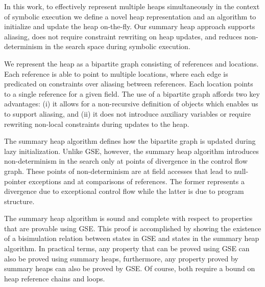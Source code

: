 
In this work, to effectively represent multiple heaps simultaneously
in the context of symbolic execution we define a novel heap
representation and an algorithm to initialize and update the heap
on-the-fly. Our summary heap approach supports aliasing, does not
require constraint rewriting on heap updates, and reduces
non-determinism in the search space during symbolic execution.

We represent the heap as a bipartite graph consisting of references
and locations. Each reference is able to point to multiple locations,
where each edge is predicated on constraints over aliasing between
references. Each location points to a single reference for a given
field. The use of a bipartite graph affords two key advantages: (i)
it allows for a non-recursive definition of objects which enables us
to support aliasing, and (ii) it does not introduce auxiliary variables or 
require rewriting non-local constraints during updates to the heap.

The summary heap algorithm defines how the bipartite graph is updated
during lazy initialization. Unlike GSE, however, the summary heap
algorithm introduces non-determinism in the search only at points of
divergence in the control flow graph. These points of non-determinism
are at field accesses that lead to null-pointer exceptions
and at comparisons of references. The former represents a divergence
due to exceptional control flow while the latter is due to program
structure.


The summary heap algorithm is sound and complete with
respect to properties that are provable using GSE. This proof is
accomplished by showing the existence of a bisimulation relation
between states in GSE and states in the summary heap algorithm. In
practical terms, any property that can be proved using GSE can also be
proved using summary heaps, furthermore, any property proved by
summary heaps can also be proved by GSE. Of course, both require a
bound on heap reference chains and loops.

